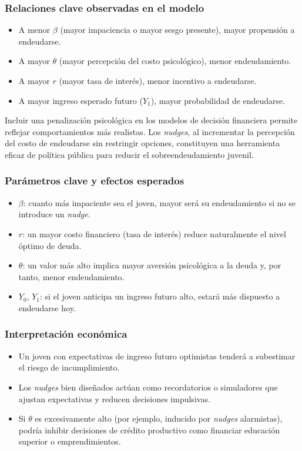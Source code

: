 \documentclass[10pt]{article}
\begin{document}
\begin{multicols}{2}
\subsubsection*{Relaciones clave observadas en el modelo}
\begin{itemize}
    \item A menor $\beta$ (mayor impaciencia o mayor sesgo presente), mayor propensión a endeudarse.
    \item A mayor $\theta$ (mayor percepción del costo psicológico), menor endeudamiento.
    \item A mayor $r$ (mayor tasa de interés), menor incentivo a endeudarse.
    \item A mayor ingreso esperado futuro ($Y_1$), mayor probabilidad de endeudarse.
\end{itemize}

Incluir una penalización psicológica en los modelos de decisión financiera permite reflejar comportamientos más realistas. Los \textit{nudges}, al incrementar la percepción del costo de endeudarse sin restringir opciones, constituyen una herramienta eficaz de política pública para reducir el sobreendeudamiento juvenil.

\subsubsection*{Parámetros clave y efectos esperados}
\begin{itemize}
    \item $\beta$: cuanto más impaciente sea el joven, mayor será su endeudamiento si no se introduce un \textit{nudge}.
    \item $r$: un mayor costo financiero (tasa de interés) reduce naturalmente el nivel óptimo de deuda.
    \item $\theta$: un valor más alto implica mayor aversión psicológica a la deuda y, por tanto, menor endeudamiento.
    \item $Y_0$, $Y_1$: si el joven anticipa un ingreso futuro alto, estará más dispuesto a endeudarse hoy.
\end{itemize}

\subsubsection*{Interpretación económica}
\begin{itemize}
    \item Un joven con expectativas de ingreso futuro optimistas tenderá a subestimar el riesgo de incumplimiento.
    \item Los \textit{nudges} bien diseñados actúan como recordatorios o simuladores que ajustan expectativas y reducen decisiones impulsivas.
    \item Si $\theta$ es excesivamente alto (por ejemplo, inducido por \textit{nudges} alarmistas), podría inhibir decisiones de crédito productivo como financiar educación superior o emprendimientos.
\end{itemize}


\end{multicols}
\end{document}
